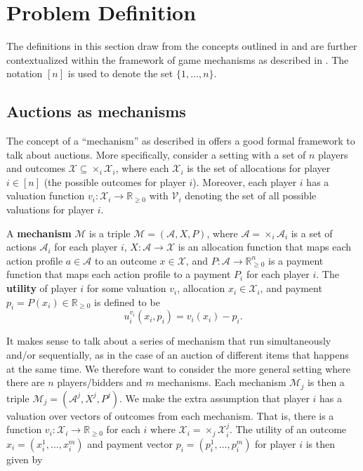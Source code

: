 \section{Problem Definition} %
\label{sec:Problem Definition}
The definitions in this section draw from the concepts outlined in \cite{Christodoulou2016TightBounds} and are further contextualized within the framework of game mechanisms as described in \cite{Syrgkanis2013Composable}. The notation $ [n] $ is used to denote the set $ \{1, \ldots, n\} $.
\subsection{Auctions as mechanisms} %
\label{sub:Auctions and allocations as mechanisms}
The concept of a ``mechanism'' as described in \cite{Syrgkanis2013Composable} offers a good formal framework to talk about auctions. More specifically,
consider a setting with a set of $ n $ players and outcomes $ \mathcal{X} \subseteq \times_i \mathcal{X}_i $, where each $ \mathcal{X}_i $ is the set of allocations for player $ i \in [n] $ (the possible outcomes for player $ i $). Moreover, each player $ i $ has a valuation function $ v_i: \mathcal{X}_i \to \mathbb{R}_{\geq 0} $ with $ \mathcal{V}_i $ denoting the set of all possible valuations for player $ i $.
\begin{definition}[Mechanism]
  A \textbf{mechanism} $ \mathcal{M} $ is a triple $ \mathcal{M} = (\mathcal{A}, X, P) $, where $ \mathcal{A} = \times_i \mathcal{A}_i $ is a set of actions $ \mathcal{A}_i $ for each player $ i $, $ X: \mathcal{A} \to \mathcal{X} $ is an allocation function that maps each action profile $ a \in \mathcal{A} $ to an outcome $ x \in \mathcal{X} $, and $ P: \mathcal{A} \to \mathbb{R}_{\geq 0}^{n} $ is a payment function that maps each action profile to a payment $ P_i $ for each player $ i $. The \textbf{utility} of player $ i $ for some valuation $ v_i $, allocation $ x_i \in \mathcal{X}_i $, and payment $ p_i = P(x_i) \in \mathbb{R}_{\geq 0} $ is defined to be
\begin{equation}
  u_i^{v_i}(x_i, p_i) = v_i(x_i) - p_i.
  \label{eq:utility}
\end{equation}
\end{definition}
It makes sense to talk about a series of mechanism that run simultaneously and/or sequentially, as in the case of an auction of different items that happens at the same time. We therefore want to consider the more general setting where there are $ n $ players/bidders and $ m $ mechanisms. Each mechanism $ \mathcal{M}_j $ is then a triple $ \mathcal{M}_j = (\mathcal{A}^j, X^j, P^j) $. We make the extra assumption that player $ i $ has a valuation over vectors of outcomes from each mechanism. That is, there is a function $ v_i: \mathcal{X}_i \to \mathbb{R}_{\geq 0} $ for each $ i $ where $ \mathcal{X}_i = \times_j \mathcal{X}_i^j $. The utility of an outcome $ x_i = (x_i^{1},\ldots, x_i^{m}) $ and payment vector $ p_i = (p_i^{1}, \ldots, p_i^{m}) $ for player $ i $ is then given by
